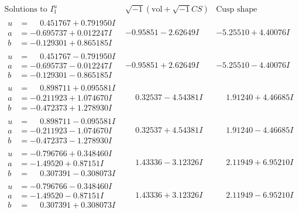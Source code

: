 \documentclass[1p]{elsarticle_modified}
\theoremstyle{definition}
\newcommand{\I}{\sqrt{-1}}
\begin{document}
$$\begin{array}{c|c|c}  
\text{Solutions to }I^u_{1}& \I (\text{vol} + \sqrt{-1}CS) & \text{Cusp shape}\\
 \hline 
\begin{aligned}
u &= \phantom{-}0.451767 + 0.791950 I \\
a &= -0.695737 + 0.012247 I \\
b &= -0.129301 + 0.865185 I\end{aligned}
 & -0.95851 - 2.62649 I & -5.25510 + 4.40076 I \\ \hline\begin{aligned}
u &= \phantom{-}0.451767 - 0.791950 I \\
a &= -0.695737 - 0.012247 I \\
b &= -0.129301 - 0.865185 I\end{aligned}
 & -0.95851 + 2.62649 I & -5.25510 - 4.40076 I \\ \hline\begin{aligned}
u &= \phantom{-}0.898711 + 0.095581 I \\
a &= -0.211923 + 1.074670 I \\
b &= -0.472373 + 1.278930 I\end{aligned}
 & \phantom{-}0.32537 - 4.54381 I & \phantom{-}1.91240 + 4.46685 I \\ \hline\begin{aligned}
u &= \phantom{-}0.898711 - 0.095581 I \\
a &= -0.211923 - 1.074670 I \\
b &= -0.472373 - 1.278930 I\end{aligned}
 & \phantom{-}0.32537 + 4.54381 I & \phantom{-}1.91240 - 4.46685 I \\ \hline\begin{aligned}
u &= -0.796766 + 0.348460 I \\
a &= -1.49520 + 0.87151 I \\
b &= \phantom{-}0.307391 - 0.308073 I\end{aligned}
 & \phantom{-}1.43336 - 3.12326 I & \phantom{-}2.11949 + 6.95210 I \\ \hline\begin{aligned}
u &= -0.796766 - 0.348460 I \\
a &= -1.49520 - 0.87151 I \\
b &= \phantom{-}0.307391 + 0.308073 I\end{aligned}
 & \phantom{-}1.43336 + 3.12326 I & \phantom{-}2.11949 - 6.95210 I \\ \hline\begin{aligned}

\end{aligned}
\end{array}$$
\end{document}
